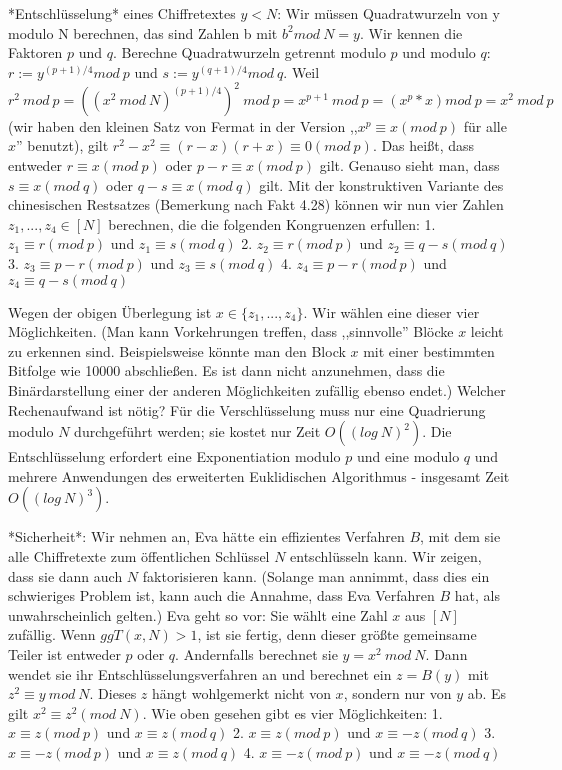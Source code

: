 \documentclass[a4paper]{article}
\begin{document}
\begin{multicols}{3}
{{{{*Entschlüsselung* eines Chiffretextes $y<N$: Wir müssen Quadratwurzeln von y modulo N berechnen, das sind Zahlen b mit $b^2 mod\ N=y$. Wir kennen die Faktoren $p$ und $q$. Berechne Quadratwurzeln getrennt modulo $p$ und modulo $q$: $r:=y^{(p+1)/4} mod\ p$ und $s:=y^{(q+1)/4} mod\ q$. 
Weil $r^2\ mod\ p =((x^2\ mod\ N)^{(p+1)/4})^2\ mod\ p=x^{p+1}\ mod\ p=(x^p *x) mod\ p = x^2\ mod\ p$ (wir haben den kleinen Satz von Fermat in der Version ,,$x^p\equiv x(mod\ p)$ für alle $x$'' benutzt), gilt $r^2-x^2\equiv (r-x)(r+x)\equiv 0 (mod\ p)$. Das heißt, dass entweder $r\equiv x(mod\ p)$ oder $p-r\equiv x(mod\ p)$ gilt.
Genauso sieht man, dass $s\equiv x(mod\ q)$ oder $q-s\equiv x(mod\ q)$ gilt.
Mit der konstruktiven Variante des chinesischen Restsatzes (Bemerkung nach Fakt 4.28) können wir nun vier Zahlen $z_1,...,z_4 \in [N]$ berechnen, die die folgenden Kongruenzen erfullen:
1. $z_1 \equiv r (mod\ p)$ und $z_1 \equiv s (mod\ q)$
2. $z_2 \equiv r (mod\ p)$ und $z_2 \equiv q-s (mod\ q)$
3. $z_3 \equiv p-r (mod\ p)$ und $z_3 \equiv s (mod\ q)$
4. $z_4 \equiv p-r (mod\ p)$ und $z_4 \equiv q-s (mod\ q)$

Wegen der obigen Überlegung ist $x\in\{z_1,...,z_4\}$. Wir wählen eine dieser vier Möglichkeiten. (Man kann Vorkehrungen treffen, dass ,,sinnvolle'' Blöcke $x$ leicht zu erkennen sind. Beispielsweise könnte man den Block $x$ mit einer bestimmten Bitfolge wie 10000 abschließen. Es ist dann nicht anzunehmen, dass die Binärdarstellung einer der anderen Möglichkeiten zufällig ebenso endet.)
Welcher Rechenaufwand ist nötig? Für die Verschlüsselung muss nur eine Quadrierung modulo $N$ durchgeführt werden; sie kostet nur Zeit $O((log\ N)^2)$. Die Entschlüsselung erfordert eine Exponentiation modulo $p$ und eine modulo $q$ und mehrere Anwendungen des erweiterten Euklidischen Algorithmus - insgesamt Zeit $O((log\ N)^3)$.

*Sicherheit*: Wir nehmen an, Eva hätte ein effizientes Verfahren $B$, mit dem sie alle Chiffretexte zum öffentlichen Schlüssel $N$ entschlüsseln kann. Wir zeigen, dass sie dann auch $N$ faktorisieren kann. (Solange man annimmt, dass dies ein schwieriges Problem ist, kann auch die Annahme, dass Eva Verfahren $B$ hat, als unwahrscheinlich gelten.)
Eva geht so vor: Sie wählt eine Zahl $x$ aus $[N]$ zufällig. Wenn $ggT(x,N)>1$, ist sie fertig, denn dieser größte gemeinsame Teiler ist entweder $p$ oder $q$. Andernfalls berechnet sie $y=x^2\ mod\ N$. Dann wendet sie ihr Entschlüsselungsverfahren an und berechnet ein $z=B(y)$ mit $z^2 \equiv y\ mod\ N$. Dieses $z$ hängt wohlgemerkt nicht von $x$, sondern nur von $y$ ab. Es gilt $x^2\equiv z^2
(mod\ N)$. Wie oben gesehen gibt es vier Möglichkeiten:
1. $x\equiv z (mod\ p)$ und $x\equiv z (mod\ q)$
2. $x\equiv z (mod\ p)$ und $x\equiv -z (mod\ q)$
3. $x\equiv -z (mod\ p)$ und $x\equiv z (mod\ q)$
4. $x\equiv -z (mod\ p)$ und $x\equiv -z (mod\ q)$

}}}}
\end{multicols}
\end{document}
